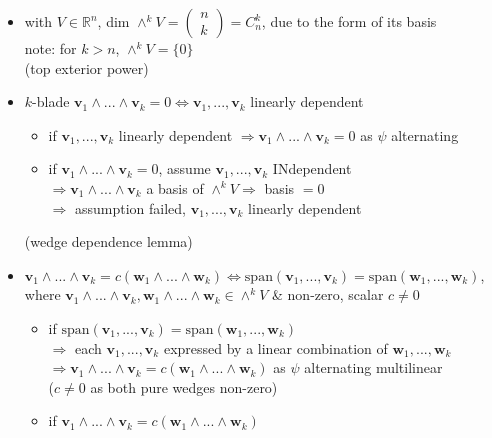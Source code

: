 \begin{itemize}
\begin{itemize}
		\begin{itemize}
		\item with $V\in\mathbb R^n$, dim $\wedge^kV=\left(\begin{smallmatrix} n \\ k \end{smallmatrix}\right) = C^k_n$, due to the form of its basis \\ 
		note: for $k > n$, $\wedge^kV=\{0\}$ \\
		(top exterior power)
		\item $k$-blade $\mathbf v_1\wedge...\wedge\mathbf v_k=0 \Leftrightarrow \mathbf v_1,...,\mathbf v_k$ linearly dependent
			\begin{itemize}
			\item if $\mathbf v_1,...,\mathbf v_k$ linearly dependent $\Rightarrow \mathbf v_1\wedge...\wedge\mathbf v_k=0$ as $\psi$ alternating
			\item if $\mathbf v_1\wedge...\wedge\mathbf v_k=0$, assume $\mathbf v_1,...,\mathbf v_k$ INdependent \\
			$\Rightarrow \mathbf v_1\wedge...\wedge\mathbf v_k$ a basis of $\wedge^kV \Rightarrow$ basis $=0$ \\
			$\Rightarrow$ assumption failed, $\mathbf v_1,...,\mathbf v_k$ linearly dependent
			\end{itemize}
			(wedge dependence lemma)
		\item $\mathbf v_1\wedge...\wedge \mathbf v_k = c(\mathbf w_1\wedge...\wedge \mathbf w_k) \Leftrightarrow \text{span}(\mathbf v_1, ..., \mathbf v_k)=\text{span}(\mathbf w_1, ..., \mathbf w_k)$, \\ 
		where $\mathbf v_1\wedge...\wedge \mathbf v_k, \mathbf w_1\wedge...\wedge\mathbf w_k\in\wedge^kV$ \& non-zero, scalar $c \neq 0$
			\begin{itemize}
			\item if $\text{span}(\mathbf v_1, ..., \mathbf v_k)=\text{span}(\mathbf w_1, ..., \mathbf w_k)$ \\
			$\Rightarrow$ each $\mathbf v_1, ..., \mathbf v_k$ expressed by a linear combination of $\mathbf w_1, ..., \mathbf w_k$ \\
			$\Rightarrow \mathbf v_1\wedge...\wedge \mathbf v_k = c(\mathbf w_1\wedge...\wedge \mathbf w_k)$ as $\psi$ alternating multilinear \\
			($c\neq0$ as both pure wedges non-zero)
			\item if $\mathbf v_1\wedge...\wedge \mathbf v_k = c(\mathbf w_1\wedge...\wedge \mathbf w_k)$
			\end{itemize}
		\end{itemize}
	\end{itemize}
\end{itemize}

